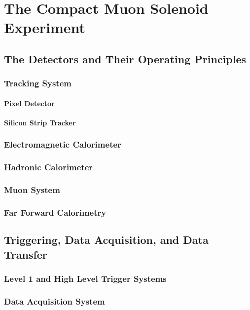 \documentclass[12pt, letterpaper]{report}
\begin{document}
\chapter{The Compact Muon Solenoid Experiment}
\section{The Detectors and Their Operating Principles}
\subsection{Tracking System}
\subsubsection{Pixel Detector}
\subsubsection{Silicon Strip Tracker}
\subsection{Electromagnetic Calorimeter}
\subsection{Hadronic Calorimeter}
\subsection{Muon System}
\subsection{Far Forward Calorimetry}
\section{Triggering, Data Acquisition, and Data Transfer}
\subsection{Level 1 and High Level Trigger Systems}
\subsection{Data Acquisition System}
\end{document}
